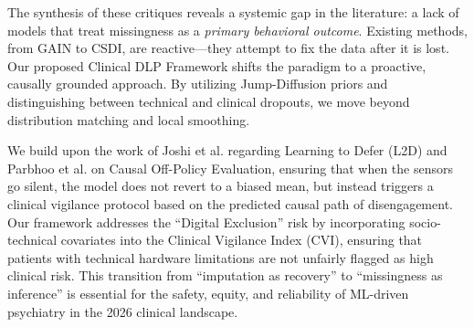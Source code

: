 The synthesis of these critiques reveals a systemic gap in the literature: a lack of models that treat missingness as a \textit{primary behavioral outcome}. Existing methods, from GAIN to CSDI, are reactive—they attempt to fix the data after it is lost. Our proposed Clinical DLP Framework shifts the paradigm to a proactive, causally grounded approach. By utilizing Jump-Diffusion priors and distinguishing between technical and clinical dropouts, we move beyond distribution matching and local smoothing.

We build upon the work of Joshi et al. \cite{joshi2021learning_to_defer} regarding Learning to Defer (L2D) and Parbhoo et al. \cite{parbhoo2022causal_ope} on Causal Off-Policy Evaluation, ensuring that when the sensors go silent, the model does not revert to a biased mean, but instead triggers a clinical vigilance protocol based on the predicted causal path of disengagement. Our framework addresses the ``Digital Exclusion'' risk by incorporating socio-technical covariates into the Clinical Vigilance Index (CVI), ensuring that patients with technical hardware limitations are not unfairly flagged as high clinical risk. This transition from ``imputation as recovery'' to ``missingness as inference'' is essential for the safety, equity, and reliability of ML-driven psychiatry in the 2026 clinical landscape.
